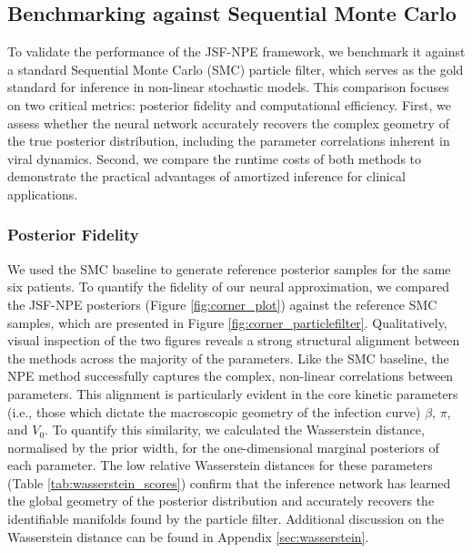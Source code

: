 \documentclass{article}
\begin{document}
\subsection{Benchmarking against Sequential Monte Carlo}
To validate the performance of the JSF-NPE framework, we benchmark it against a standard Sequential Monte Carlo (SMC) particle filter, which serves as the gold standard for inference in non-linear stochastic models. This comparison focuses on two critical metrics: posterior fidelity and computational efficiency. First, we assess whether the neural network accurately recovers the complex geometry of the true posterior distribution, including the parameter correlations inherent in viral dynamics. Second, we compare the runtime costs of both methods to demonstrate the practical advantages of amortized inference for clinical applications.

\subsubsection{Posterior Fidelity}

We used the SMC baseline to generate reference posterior samples for the same six patients. To quantify the fidelity of our neural approximation, we compared the JSF-NPE posteriors (Figure \ref{fig:corner_plot}) against the reference SMC samples, which are presented in Figure \ref{fig:corner_particlefilter}. Qualitatively, visual inspection of the two figures reveals a strong structural alignment between the methods across the majority of the parameters. Like the SMC baseline, the NPE method successfully captures the complex, non-linear correlations between parameters. This alignment is particularly evident in the core kinetic parameters (i.e., those which dictate the macroscopic geometry of the infection curve) $\beta$, $\pi$, and $V_0$. To quantify this similarity, we calculated the Wasserstein distance, normalised by the prior width, for the one-dimensional marginal posteriors of each parameter. The low relative Wasserstein distances for these parameters (Table \ref{tab:wasserstein_scores}) confirm that the inference network has learned the global geometry of the posterior distribution and accurately recovers the identifiable manifolds found by the particle filter. Additional discussion on the Wasserstein distance can be found in Appendix \ref{sec:wasserstein}.
\end{document}
